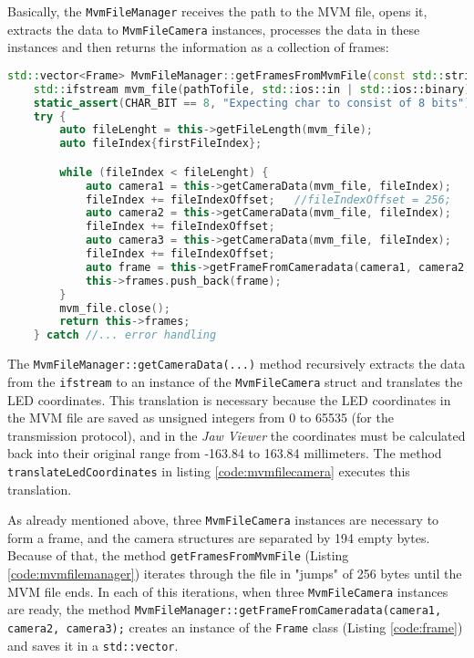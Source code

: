 Basically, the \verb|MvmFileManager| receives the path to the \gls{MVM} file, opens it, extracts the data to \verb|MvmFileCamera| instances, processes the data in these instances and then returns the information as a collection of frames:
\begin{lstlisting}[language=C++,caption={MvmFileManager getFramesFromMvmFile method}, label={code:mvmfilemanager}]
std::vector<Frame> MvmFileManager::getFramesFromMvmFile(const std::string pathTofile) {
	std::ifstream mvm_file(pathTofile, std::ios::in | std::ios::binary);
	static_assert(CHAR_BIT == 8, "Expecting char to consist of 8 bits");
	try {
		auto fileLenght = this->getFileLength(mvm_file);
		auto fileIndex{firstFileIndex};

		while (fileIndex < fileLenght) {
			auto camera1 = this->getCameraData(mvm_file, fileIndex);
			fileIndex += fileIndexOffset;	//fileIndexOffset = 256;
			auto camera2 = this->getCameraData(mvm_file, fileIndex);
			fileIndex += fileIndexOffset;
			auto camera3 = this->getCameraData(mvm_file, fileIndex);
			fileIndex += fileIndexOffset;
			auto frame = this->getFrameFromCameradata(camera1, camera2, camera3);
			this->frames.push_back(frame);
		}
		mvm_file.close();
		return this->frames;
	} catch //... error handling
\end{lstlisting}

The \verb|MvmFileManager::getCameraData(...)| method recursively extracts the data from the \verb|ifstream| to an instance of the \verb|MvmFileCamera| struct and translates the LED coordinates.
This translation is necessary because the LED coordinates in the MVM file are saved as unsigned integers from 0 to 65535 (for the transmission protocol), and in the \emph{Jaw Viewer} the coordinates must be calculated back into their original range from -163.84 to 163.84 millimeters. The method \verb|translateLedCoordinates| in listing \ref{code:mvmfilecamera} executes this translation.

As already mentioned above, three \verb|MvmFileCamera| instances are necessary to form a frame, and the camera structures are separated by 194 empty bytes. Because of that, the method \verb|getFramesFromMvmFile| (Listing \ref{code:mvmfilemanager}) iterates through the file in "jumps" of 256 bytes until the MVM file ends.
In each of this iterations, when three \verb|MvmFileCamera| instances are ready, the method \verb|MvmFileManager::getFrameFromCameradata(camera1, camera2, camera3);| creates an instance of the \verb|Frame| class (Listing \ref{code:frame}) and saves it in a \verb|std::vector|.

